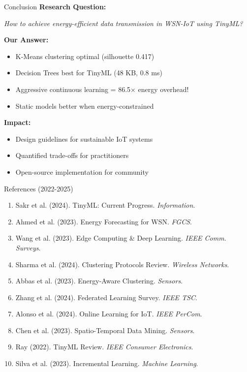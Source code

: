 \documentclass[aspectratio=169]{beamer}
\begin{document}
\begin{frame}{Conclusion}
\textbf{Research Question:}
\begin{center}
\textit{How to achieve energy-efficient data transmission in WSN-IoT using TinyML?}
\end{center}

\vspace{0.3cm}
\textbf{Our Answer:}
\begin{itemize}
    \item \textcolor{iiitlgreen}{\checkmark} K-Means clustering optimal (silhouette 0.417)
    \item \textcolor{iiitlgreen}{\checkmark} Decision Trees best for TinyML (48 KB, 0.8 ms)
    \item \textcolor{iiitlred}{\checkmark} Aggressive continuous learning = 86.5× energy overhead!
    \item \textcolor{iiitlgreen}{\checkmark} Static models better when energy-constrained
\end{itemize}

\vspace{0.5cm}
\textbf{Impact:}
\begin{itemize}
    \item Design guidelines for sustainable IoT systems
    \item Quantified trade-offs for practitioners
    \item Open-source implementation for community
\end{itemize}
\end{frame}

\begin{frame}{References (2022-2025)}
\footnotesize
\begin{enumerate}
    \item Sakr et al. (2024). TinyML: Current Progress. \textit{Information}.
    \item Ahmed et al. (2023). Energy Forecasting for WSN. \textit{FGCS}.
    \item Wang et al. (2023). Edge Computing \& Deep Learning. \textit{IEEE Comm. Surveys}.
    \item Sharma et al. (2024). Clustering Protocols Review. \textit{Wireless Networks}.
    \item Abbas et al. (2023). Energy-Aware Clustering. \textit{Sensors}.
    \item Zhang et al. (2024). Federated Learning Survey. \textit{IEEE TSC}.
    \item Alonso et al. (2024). Online Learning for IoT. \textit{IEEE PerCom}.
    \item Chen et al. (2023). Spatio-Temporal Data Mining. \textit{Sensors}.
    \item Ray (2022). TinyML Review. \textit{IEEE Consumer Electronics}.
    \item Silva et al. (2023). Incremental Learning. \textit{Machine Learning}.
\end{enumerate}
\end{frame}
\end{document}
